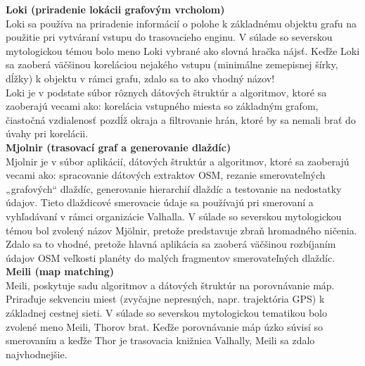 \noindent \textbf{Loki (priradenie lokácii grafovým vrcholom)}\\ %
\indent Loki sa používa na priradenie informácií o polohe k základnému objektu grafu na použitie pri vytváraní vstupu do trasovacieho enginu. V súlade so severskou mytologickou témou bolo meno Loki vybrané ako slovná hračka nájsť. Keďže Loki sa zaoberá väčšinou koreláciou nejakého vstupu (minimálne zemepisnej šírky, dĺžky) k objektu v rámci grafu, zdalo sa to ako vhodný názov!\\
\indent Loki je v podstate súbor rôznych dátových štruktúr a algoritmov, ktoré sa zaoberajú vecami ako: korelácia vstupného miesta so základným grafom, čiastočná vzdialenosť pozdĺž okraja a filtrovanie hrán, ktoré by sa nemali brať do úvahy pri korelácii.\\

\noindent \textbf{Mjolnir (trasovací graf a generovanie dlaždíc)}\\
\indent Mjolnir je v súbor aplikácií, dátových štruktúr a algoritmov, ktoré sa zaoberajú vecami ako: spracovanie dátových extraktov OSM, rezanie smerovateľných „grafových“ dlaždíc, generovanie hierarchií dlaždíc a testovanie na nedostatky údajov. Tieto dlaždicové smerovacie údaje sa používajú pri smerovaní a vyhľadávaní v rámci organizácie Valhalla. V súlade so severskou mytologickou témou bol zvolený názov Mjölnir, pretože predstavuje zbraň hromadného ničenia. Zdalo sa to vhodné, pretože hlavná aplikácia sa zaoberá väčšinou rozbíjaním údajov OSM veľkosti planéty do malých fragmentov smerovateľných dlaždíc. \\%

\noindent \textbf{Meili (map matching)}\\  %
\indent Meili, poskytuje sadu algoritmov a dátových štruktúr na porovnávanie máp. Priraďuje sekvenciu miest (zvyčajne nepresných, napr. trajektória GPS) k základnej cestnej sieti. V súlade so severskou mytologickou tematikou bolo zvolené meno Meili, Thorov brat. Keďže porovnávanie máp úzko súvisí so smerovaním a keďže Thor je trasovacia knižnica Valhally, Meili sa zdalo najvhodnejšie.


